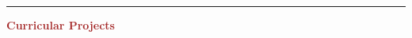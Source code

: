 \documentclass[11pt, letterpaper]{article}
\begin{document}
\vspace{-10pt}
\noindent \rule[2pt]{\textwidth}{0.5pt}
\noindent \textbf{\large \textcolor{Brown}{Curricular Projects}}\\
\end{document}
